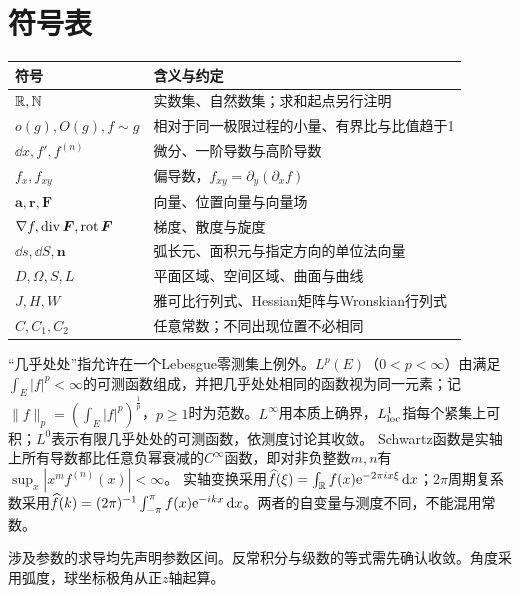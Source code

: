 \chapter{符号表}
\par\noindent\begin{tabularx}{\textwidth}{lX}\toprule
符号&含义与约定\\\midrule
$\mathbb{R},\mathbb N$&实数集、自然数集；求和起点另行注明\\
$o(g),O(g),f\sim g$&相对于同一极限过程的小量、有界比与比值趋于1\\
$\dd x, f', f^{(n)}$&微分、一阶导数与高阶导数\\
$f_x,f_{xy}$&偏导数，$f_{xy}=\partial_y(\partial_x f)$\\
$\bm a,\bm r,\bm F$&向量、位置向量与向量场\\
$\nabla f,\operatorname{div}\bm F,\operatorname{rot}\bm F$&梯度、散度与旋度\\
$\dd s,\dd S,\bm n$&弧长元、面积元与指定方向的单位法向量\\
$D,\Omega,S,L$&平面区域、空间区域、曲面与曲线\\
$J, H, W$&雅可比行列式、Hessian矩阵与Wronskian行列式\\
$C,C_1,C_2$&任意常数；不同出现位置不必相同\\\bottomrule
\end{tabularx}
\begin{tcolorbox}[title=进阶符号的定义,colframe=Ink]
“几乎处处”指允许在一个Lebesgue零测集上例外。$L^p(E)$（$0<p<\infty$）由满足$\int_E|f|^p<\infty$的可测函数组成，并把几乎处处相同的函数视为同一元素；记$\|f\|_p=(\int_E|f|^p)^{\frac{1}{p}}$，$p\ge1$时为范数。$L^\infty$用本质上确界，$L^1_{\rm loc}$指每个紧集上可积；$L^0$表示有限几乎处处的可测函数，依测度讨论其收敛。
Schwartz函数是实轴上所有导数都比任意负幂衰减的$C^\infty$函数，即对非负整数$m,n$有$\sup_x|x^mf^{(n)}(x)|<\infty$。
实轴变换采用$\widehat f(\xi)=\int_{\mathbb{R}} f(x)\mathrm{e}^{-2\pi ix\xi}\mathop{}\!\mathrm{d} x$；$2\pi$周期复系数采用$\widehat f(k)=(2\pi)^{-1}\int_{-\pi}^{\pi}f(x)\mathrm{e}^{-ikx}\mathop{}\!\mathrm{d} x$。两者的自变量与测度不同，不能混用常数。
\end{tcolorbox}
涉及参数的求导均先声明参数区间。反常积分与级数的等式需先确认收敛。角度采用弧度，球坐标极角从正$z$轴起算。
